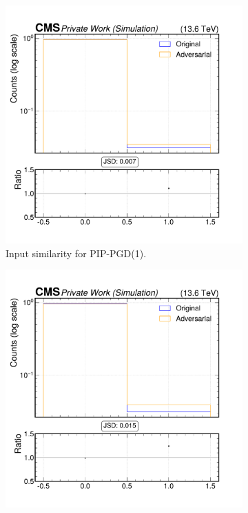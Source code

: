 \begin{figure}[h]
  \centering
  \begin{subfigure}[t]{0.32\textwidth}
    \includegraphics[width=\linewidth]{media/output/features/compare/combined_it_1/cmp_npf_arr_Npfcan_HadFrac.pdf}
    \caption*{Input similarity for PIP-PGD(1).}
  \end{subfigure}\hfill
  \begin{subfigure}[t]{0.32\textwidth}
    \includegraphics[width=\linewidth]{media/output/features/compare/combined_it_2/cmp_npf_arr_Npfcan_HadFrac.pdf}

\end{subfigure}
\end{figure}
